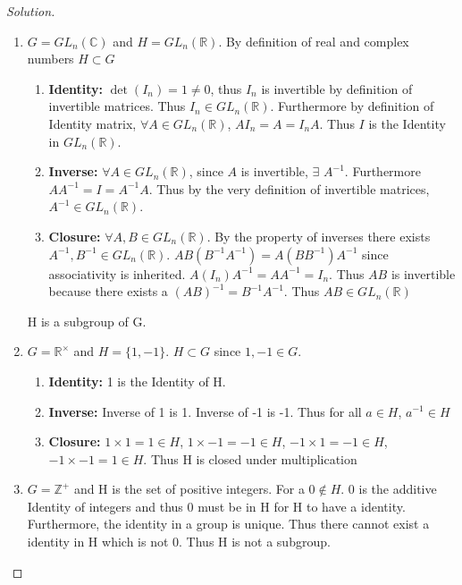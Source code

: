 \documentclass{article}
\newcommand{\C}{\mathbb{C}}
\newcommand{\R}{\mathbb{R}}
\newcommand{\Z}{\mathbb{Z}}
\newenvironment{solution}
{\renewcommand\qedsymbol{$\blacksquare$}\begin{proof}[Solution]}
{\end{proof}}
\begin{document}
\begin{solution}
    \begin{enumerate}{}
        \item $G = GL_n(\C)$ and $H = GL_n(\R)$. By definition of real and complex numbers $H \subset G$
        
        \begin{enumerate}{}
            \item \textbf{Identity: } $\det(I_n) = 1 \neq 0$, thus $I_n$ is invertible by definition of invertible matrices. Thus $I_n \in GL_n(\R)$. Furthermore by definition of Identity matrix, $\forall A \in GL_n(\R)$, $AI_n = A = I_nA$. Thus $I$ is the Identity in $GL_n(\R)$.
            \item \textbf{Inverse: } $\forall A \in GL_n(\R)$, since $A$ is invertible, $\exists$ $A^{-1}$. Furthermore $A A^{-1} = I = A^{-1}A$. Thus by the very definition of invertible matrices, $A^{-1} \in GL_n(\R)$.
            \item \textbf{Closure: } $\forall A, B \in GL_n(\R)$. By the property of inverses there exists $A^{-1}, B^{-1} \in GL_n(\R)$. $AB (B^{-1}A^{-1}) = A(BB^{-1})A^{-1}$ since associativity is inherited. $A(I_n)A^{-1} = AA^{-1} = I_n$. Thus $AB$ is invertible because there exists a $(AB)^{-1} = B^{-1}A^{-1}$. Thus $AB \in GL_n(\R)$
        \end{enumerate}

        H is a subgroup of G.

        \item $G = \R^\times$ and $H=\{1,-1\}$. $H \subset G$ since $1, -1 \in G$.
        
        \begin{enumerate}{}
            \item \textbf{Identity: } 1 is the Identity of H. 
            \item \textbf{Inverse: } Inverse of 1 is 1. Inverse of -1 is -1. Thus for all $a \in H$, $a^{-1} \in H$
            \item \textbf{Closure: } $1 \times 1 = 1 \in H$, $1 \times -1 = -1 \in H$, $-1 \times 1 = - 1 \in H$, $-1 \times -1 = 1 \in H$. Thus H is closed under multiplication
            
        \end{enumerate}

        \item $G = \Z^+$ and H is the set of positive integers.
        For a $0 \not \in H$. 0 is the additive Identity of integers and thus 0 must be in H for H to have a identity. Furthermore, the identity in a group is unique. Thus there cannot exist a identity in H which is not 0. Thus H is not a subgroup.


\end{enumerate}
\end{solution}
\end{document}
